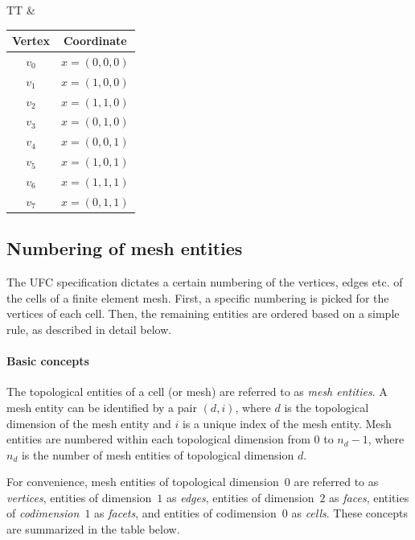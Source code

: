 \begin{center}
\bwfig
  \begin{tabular}{TT}
    &
    \begin{tabular}{cc}
      \toprule
      Vertex & Coordinate \\
      \hline
      $v_0$ & $x = (0, 0, 0)$ \\
      $v_1$ & $x = (1, 0, 0)$ \\
      $v_2$ & $x = (1, 1, 0)$ \\
      $v_3$ & $x = (0, 1, 0)$ \\
      $v_4$ & $x = (0, 0, 1)$ \\
      $v_5$ & $x = (1, 0, 1)$ \\
      $v_6$ & $x = (1, 1, 1)$ \\
      $v_7$ & $x = (0, 1, 1)$ \\
      \bottomrule
    \end{tabular}
  \end{tabular}
\end{center}


\subsection{Numbering of mesh entities}

%


The UFC specification dictates a certain numbering of the vertices,
edges etc. of the cells of a finite element mesh. First, a specific
numbering is picked for the vertices of each cell. Then, the
remaining entities are ordered based on a simple rule, as described in
detail below.

\paragraph{Basic concepts}

The topological entities of a cell (or mesh) are referred to as
\emph{mesh entities}. A mesh entity can be identified by a pair $(d,
i)$, where $d$ is the topological dimension of the mesh entity and $i$
is a unique index of the mesh entity. Mesh entities are numbered
within each topological dimension from $0$ to $n_d-1$, where $n_d$ is
the number of mesh entities of topological dimension $d$.

For convenience, mesh entities of topological dimension~$0$ are
referred to as \emph{vertices}, entities of dimension~$1$ as
\emph{edges}, entities of dimension~$2$ as \emph{faces}, entities of
\emph{codimension}~$1$ as \emph{facets}, and entities of codimension~$0$
as \emph{cells}. These concepts are summarized in the table below.

